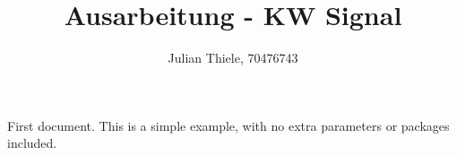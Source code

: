 \documentclass[12pt]{article}
\title{Ausarbeitung - KW Signal}
\author{Julian Thiele, 70476743}
\begin{document}
\maketitle
\newpage

First document. This is a simple example, with no 
extra parameters or packages included.
\end{document}
